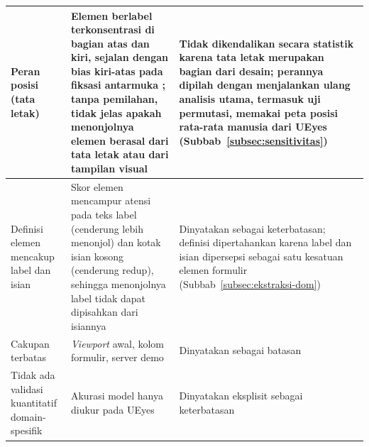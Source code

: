 \begin{longtable}{>{\raggedright\arraybackslash}p{}>{\raggedright\arraybackslash}p{}>{\raggedright\arraybackslash}p{}}
\hline
Peran posisi (tata letak) & Elemen berlabel terkonsentrasi di bagian atas dan kiri, sejalan dengan bias kiri-atas pada fiksasi antarmuka \citep{jiang2023ueyes}; tanpa pemilahan, tidak jelas apakah menonjolnya elemen berasal dari tata letak atau dari tampilan visual & Tidak dikendalikan secara statistik karena tata letak merupakan bagian dari desain; perannya dipilah dengan menjalankan ulang analisis utama, termasuk uji permutasi, memakai peta posisi rata-rata manusia dari UEyes (Subbab~\ref{subsec:sensitivitas}) \\
\hline
Definisi elemen mencakup label dan isian & Skor elemen mencampur atensi pada teks label (cenderung lebih menonjol) dan kotak isian kosong (cenderung redup), sehingga menonjolnya label tidak dapat dipisahkan dari isiannya & Dinyatakan sebagai keterbatasan; definisi dipertahankan karena label dan isian dipersepsi sebagai satu kesatuan elemen formulir (Subbab~\ref{subsec:ekstraksi-dom}) \\
\hline
Cakupan terbatas & \emph{Viewport} awal, kolom formulir, server demo & Dinyatakan sebagai batasan \\
\hline
Tidak ada validasi kuantitatif domain-spesifik & Akurasi model hanya diukur pada UEyes & Dinyatakan eksplisit sebagai keterbatasan \\
\end{longtable}
